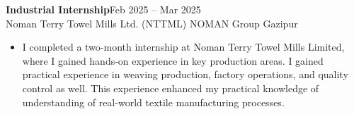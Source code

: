 

\textbf{Industrial Internship}\hfill Feb 2025 – Mar 2025\\
\vspace{1mm}
Noman Terry Towel Mills Ltd. (NTTML) \textbar{} NOMAN Group \hfill Gazipur\\
\begin{itemize}
	\item
	      \vspace{-2mm}
	      \begin{justify}I completed a two-month internship at Noman Terry Towel Mills Limited, where I gained hands-on experience in key production areas. I gained practical experience in weaving production, factory operations, and quality control as well. This experience enhanced my practical knowledge of understanding of real-world textile manufacturing processes.
	      \end{justify}
\end{itemize}